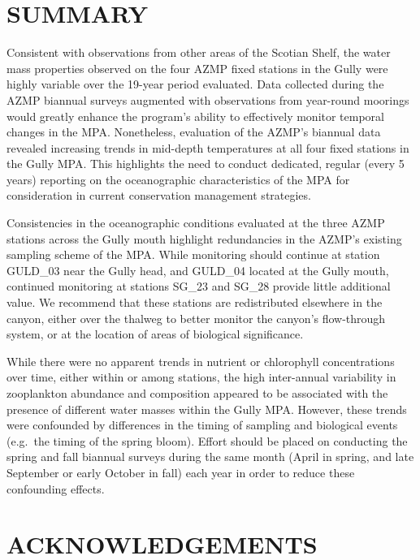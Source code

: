 \documentclass[12pt]{article}\usepackage[]{graphicx}\usepackage[]{color}
\begin{document}
\clearpage

\hypertarget{sec:summary}{%
\section{SUMMARY}\label{sec:summary}}

Consistent with observations from other areas of the Scotian Shelf, the water mass properties observed on the four AZMP fixed stations in the Gully were highly variable over the 19-year period evaluated. Data collected during the AZMP biannual surveys augmented with observations from year-round moorings would greatly enhance the program's ability to effectively monitor temporal changes in the MPA. Nonetheless, evaluation of the AZMP's biannual data revealed increasing trends in mid-depth temperatures at all four fixed stations in the Gully MPA. This highlights the need to conduct dedicated, regular (every 5 years) reporting on the oceanographic characteristics of the MPA for consideration in current conservation management strategies.

Consistencies in the oceanographic conditions evaluated at the three AZMP stations across the Gully mouth highlight redundancies in the AZMP's existing sampling scheme of the MPA. While monitoring should continue at station GULD\_03 near the Gully head, and GULD\_04 located at the Gully mouth, continued monitoring at stations SG\_23 and SG\_28 provide little additional value. We recommend that these stations are redistributed elsewhere in the canyon, either over the thalweg to better monitor the canyon's flow-through system, or at the location of areas of biological significance.

While there were no apparent trends in nutrient or chlorophyll concentrations over time, either within or among stations, the high inter-annual variability in zooplankton abundance and composition appeared to be associated with the presence of different water masses within the Gully MPA. However, these trends were confounded by differences in the timing of sampling and biological events (e.g.~the timing of the spring bloom). Effort should be placed on conducting the spring and fall biannual surveys during the same month (April in spring, and late September or early October in fall) each year in order to reduce these confounding effects.

\clearpage

\hypertarget{sec:acknowledgements}{%
\section{ACKNOWLEDGEMENTS}\label{sec:acknowledgements}}
\end{document}
